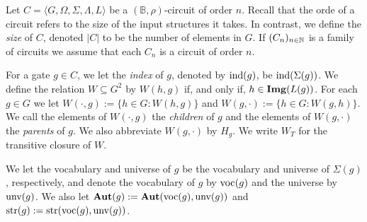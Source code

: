 \documentclass[../paper.tex]{subfiles}
\begin{document}
Let $C = \langle G, \Omega, \Sigma, \Lambda, L \rangle$ be a $(\mathbb{B},
\rho)$-circuit of order $n$.  Recall that the orde of a circuit refers
to the size of the input structures it takes.  In contrast, we define
the \emph{size} of $C$, denoted $\vert C \vert$ to be the number of
elements in $G$. If $(C_n)_{n \in \mathbb{N}}$ is a family of
circuits we assume that each $C_n$ is a circuit of order $n$.

For a gate $g \in C$, we let the \emph{index} of $g$, denoted by $\text{\upshape ind}(g)$, be
$\text{\upshape ind}(\Sigma(g))$. We define the relation $W \subseteq G^2$ by $W(h,g)$ if, and
only if, $h \in \text{\textbf{Img}}(L(g))$. For each $g \in G$ we let $W(\cdot, g) := \{h \in G
: W(h,g)\}$ and $W(g, \cdot) := \{h \in G : W(g,h)\}$. We call the elements of
$W(\cdot, g)$ the \emph{children} of $g$ and the elements of $W(g, \cdot)$ the
\emph{parents} of $g$. We also abbreviate $W(g, \cdot)$ by $H_g$. We write $W_T$
for the transitive closure of $W$.

We let the vocabulary and universe of $g$ be the vocabulary and universe of
$\Sigma(g)$, respectively, and denote the vocabulary of $g$ by $\text{voc}(g)$ and
the universe by $\text{unv}(g)$. We also let $\text{\textbf{Aut}}(g) := \text{\textbf{Aut}}(\text{voc}(g),
\text{unv}(g))$ and $\text{str}(g) := \text{str}(\text{voc}(g), \text{unv}(g))$.



\end{document}
